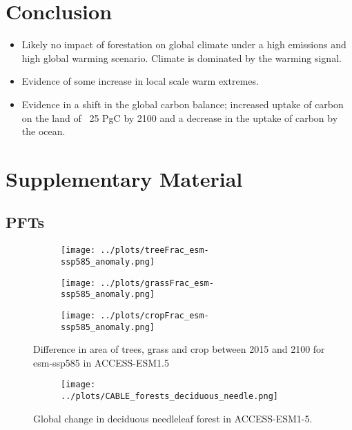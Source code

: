 \documentclass[]{article}
\begin{document}
\section{Conclusion}

\begin{itemize}
    \item Likely no impact of forestation on global climate under a high emissions and high global warming scenario. Climate is dominated by the warming signal.
    \item Evidence of some increase in local scale warm extremes.
    \item Evidence in a shift in the global carbon balance; increased uptake of carbon on the land of ~25 PgC by 2100 and a decrease in the uptake of carbon by the ocean.
\end{itemize}

\printbibliography

\section{Supplementary Material}
\setcounter{figure}{0}

\subsection{PFTs}

\begin{figure}[H]
    \centering
    \begin{subfigure}[b]{0.4\linewidth}
        \texttt{[image: ../plots/treeFrac\_esm-ssp585\_anomaly.png]}
    \end{subfigure}
    \begin{subfigure}[b]{0.4\linewidth}
        \texttt{[image: ../plots/grassFrac\_esm-ssp585\_anomaly.png]}
    \end{subfigure}
    \begin{subfigure}[b]{0.4\linewidth}
        \texttt{[image: ../plots/cropFrac\_esm-ssp585\_anomaly.png]}
    \end{subfigure}
    \caption{Difference in area of trees, grass and crop between 2015 and 2100 for esm-ssp585 in ACCESS-ESM1.5}
    \label{fig:ACCESS_land_cover}
\end{figure}

\begin{figure}[H]
    \centering
    \begin{subfigure}[b]{0.45\linewidth}
        \texttt{[image: ../plots/CABLE\_forests\_deciduous\_needle.png]}
    \end{subfigure}
    \caption{Global change in deciduous needleleaf forest in ACCESS-ESM1-5.}
    \label{fig:ACCESS_dec_needle_cover}
\end{figure}
\end{document}
